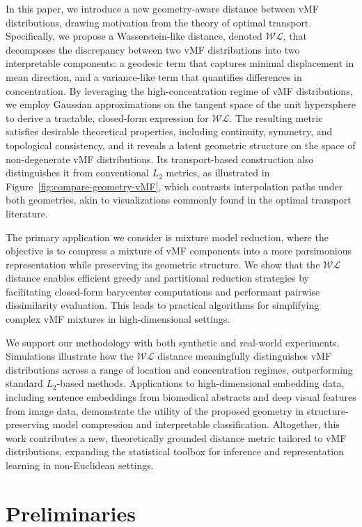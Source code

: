\documentclass[10pt]{article}
\newcommand{\WL}{\mathcal{WL}}
\begin{document}
In this paper, we introduce a new geometry-aware distance between vMF distributions, drawing motivation from the theory of optimal transport. Specifically, we propose a Wasserstein-like distance, denoted $\WL$, that decomposes the discrepancy between two vMF distributions into two interpretable components: a geodesic term that captures minimal displacement in mean direction, and a variance-like term that quantifies differences in concentration. By leveraging the high-concentration regime of vMF distributions, we employ Gaussian approximations on the tangent space of the unit hypersphere to derive a tractable, closed-form expression for $\WL$. The resulting metric satisfies desirable theoretical properties, including continuity, symmetry, and topological consistency, and it reveals a latent geometric structure on the space of non-degenerate vMF distributions. Its transport-based construction also distinguishes it from conventional $L_2$ metrics, as illustrated in Figure~\ref{fig:compare-geometry-vMF}, which contrasts interpolation paths under both geometries, akin to visualizations commonly found in the optimal transport literature.

The primary application we consider is mixture model reduction, where the objective is to compress a mixture of vMF components into a more parsimonious representation while preserving its geometric structure. We show that the $\WL$ distance enables efficient greedy and partitional reduction strategies by facilitating closed-form barycenter computations and performant pairwise dissimilarity evaluation. This leads to practical algorithms for simplifying complex vMF mixtures in high-dimensional settings.

We support our methodology with both synthetic and real-world experiments. Simulations illustrate how the $\WL$ distance meaningfully distinguishes vMF distributions across a range of location and concentration regimes, outperforming standard $L_2$-based methods. Applications to high-dimensional embedding data, including sentence embeddings from biomedical abstracts and deep visual features from image data, demonstrate the utility of the proposed geometry in structure-preserving model compression and interpretable classification. Altogether, this work contributes a new, theoretically grounded distance metric tailored to vMF distributions, expanding the statistical toolbox for inference and representation learning in non-Euclidean settings.


\section{Preliminaries}
\end{document}

